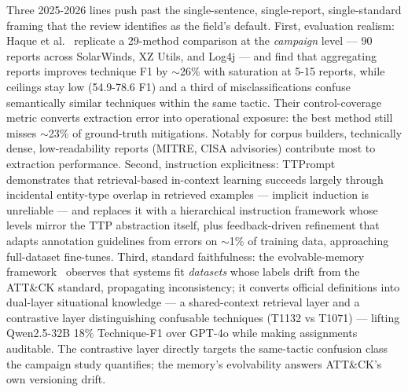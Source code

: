 \documentclass[11pt]{article}
\begin{document}
Three 2025-2026 lines push past the single-sentence, single-report, single-standard framing that the review identifies as the field's default. First, evaluation realism: Haque et al.~\citep{haque2026single} replicate a 29-method comparison at the \emph{campaign} level — 90 reports across SolarWinds, XZ Utils, and Log4j — and find that aggregating reports improves technique F1 by $\sim$26\% with saturation at 5-15 reports, while ceilings stay low (54.9-78.6 F1) and a third of misclassifications confuse semantically similar techniques within the same tactic. Their control-coverage metric converts extraction error into operational exposure: the best method still misses $\sim$23\% of ground-truth mitigations. Notably for corpus builders, technically dense, low-readability reports (MITRE, CISA advisories) contribute most to extraction performance. Second, instruction explicitness: TTPrompt~\citep{peng2025retrieval} demonstrates that retrieval-based in-context learning succeeds largely through incidental entity-type overlap in retrieved examples — implicit induction is unreliable — and replaces it with a hierarchical instruction framework whose levels mirror the TTP abstraction itself, plus feedback-driven refinement that adapts annotation guidelines from errors on $\sim$1\% of training data, approaching full-dataset fine-tunes. Third, standard faithfulness: the evolvable-memory framework~\citep{meng2025instantiating} observes that systems fit \emph{datasets} whose labels drift from the ATT\&CK standard, propagating inconsistency; it converts official definitions into dual-layer situational knowledge — a shared-context retrieval layer and a contrastive layer distinguishing confusable techniques (T1132 vs T1071) — lifting Qwen2.5-32B 18\% Technique-F1 over GPT-4o while making assignments auditable. The contrastive layer directly targets the same-tactic confusion class the campaign study quantifies; the memory's evolvability answers ATT\&CK's own versioning drift.
\end{document}
